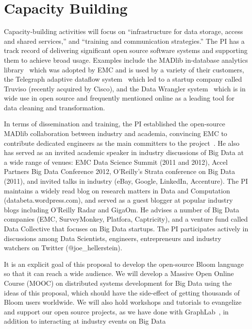 \section{Capacity Building}
\label{sec:capacity}
Capacity-building activities will focus on ``infrastructure for data
storage, access and shared services,'' and ``training and
communication strategies.''  The PI has a track record of
delivering significant open source software systems and
supporting them to achieve broad usage.  Examples include the MADlib in-database analytics library~\cite{madlib} which
was adopted by EMC and is used by a variety of their customers, the Telegraph adaptive dataflow system~\cite{Chandrasekaran2003} which led to a startup company called Truviso (recently acquired by Cisco), and the Data Wrangler system~\cite{datawrangler} which is in wide use in open source and frequently mentioned online as a leading tool for data cleaning and transformation.  

In
terms of dissemination and training, the PI established the open-source MADlib
  collaboration between industry and academia, convincing EMC to
  contribute dedicated engineers as the main committers to the project~\cite{madlib}.  He also has served as an invited academic
  speaker in industry discussions of Big Data at a wide range of venues: EMC Data Science Summit (2011
  and 2012), Accel Partners Big Data Conference 2012,
  O'Reilly's Strata conference on Big Data (2011), and invited talks in
  industry (eBay, Google, LinkedIn, Accenture).  The PI maintains a widely read blog on
  research matters in Data and Computation (databeta.wordpress.com),
  and served as a guest blogger at popular industry blogs including
  O'Reilly Radar and GigaOm.  He advises a number of Big Data companies
  (EMC, SurveyMonkey, Platfora, Captricity), and 
  a venture fund called Data Collective that focuses on Big Data
  startups. The PI participates actively in discussions among Data
  Scientists, engineers, entrepreneurs and industry watchers on
  Twitter (@joe\_hellerstein).

It is an explicit goal of this proposal to develop the open-source
Bloom language so that it can reach a wide
audience.  We will develop a Massive Open Online Course (MOOC) on distributed systems development for Big Data using the ideas of this proposal, which should have the side-effect of getting thousands of Bloom users worldwide.  We will also hold workshops and tutorials to
evangelize and support our open source projects, as we have done with
GraphLab~\cite{uaigraphlab}, in addition to interacting at industry events on
Big Data


